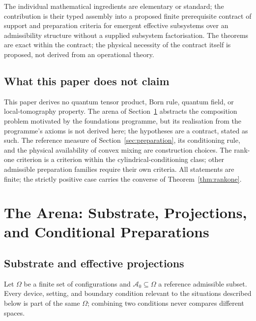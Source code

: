 \documentclass[11pt,a4paper]{article}
\newcommand{\Om}{\Omega}
\newcommand{\Aref}{\mathcal{A}_0}
\begin{document}
    The individual mathematical ingredients are elementary or standard; the contribution is their typed
    assembly into a proposed finite prerequisite contract of support and preparation criteria for emergent
    effective subsystems over an admissibility structure without a supplied subsystem factorisation.
    The theorems are exact within the contract; the physical necessity of the contract itself is proposed,
    not derived from an operational theory.

  \subsection{What this paper does not claim}
    \label{ssec:nonclaims}

    This paper derives no quantum tensor product, Born rule, quantum field, or local-tomography property.
    The arena of Section~\ref{sec:arena} abstracts the composition problem motivated by the foundations
    programme, but its realisation from the programme's axioms is not derived here; the hypotheses are a
    contract, stated as such.
    The reference measure of Section~\ref{sec:preparation}, its conditioning rule, and the physical
    availability of convex mixing are construction choices.
    The rank-one criterion is a criterion within the cylindrical-conditioning class; other admissible
    preparation families require their own criteria.
    All statements are finite; the strictly positive case carries the converse of
    Theorem~\ref{thm:rankone}.

  \section{The Arena: Substrate, Projections, and Conditional Preparations}
  \label{sec:arena}

  \subsection{Substrate and effective projections}
    \label{ssec:substrate}

    Let $\Om$ be a finite set of configurations and $\Aref \subseteq \Om$ a reference admissible subset.
    Every device, setting, and boundary condition relevant to the situations described below is part of the
    same $\Om$; combining two conditions never compares different spaces.
\end{document}
